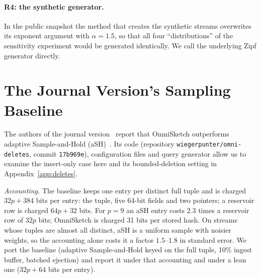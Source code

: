 \documentclass[sigconf,review,anonymous]{acmart}
\newcommand{\omni}{OmniSketch\xspace}
\begin{document}
\paragraph{R4: the synthetic generator.} In the public snapshot the method that creates the synthetic
streams overwrites its exponent argument with $\alpha=1.5$, so that all four ``distributions'' of the
sensitivity experiment would be generated identically. We call the underlying Zipf generator directly.

\section{The Journal Version's Sampling Baseline}\label{app:journal}

\begin{table}[t]
\centering\footnotesize\setlength{\tabcolsep}{2.5pt}
\caption{Journal-style stream (9 Zipf$^\dagger$ attributes with $\alpha=1.3$, 5 million records):
normalized absolute error for the journal version's query procedure and for our record-sampled queries
(mean of 3 seeds). ``Journal acct.'': memory accounting of that version's code.}
\label{tab:journal}

\end{table}

\begin{table}[t]
\centering\footnotesize\setlength{\tabcolsep}{3pt}
\caption{Journal-style queries at 10\,MB, by number of predicates $k$.}
\label{tab:journalk}

\end{table}

The authors of the journal version~\cite{omni-vldbj} report that \omni outperforms adaptive
Sample-and-Hold (aSH)~\cite{ash}. Its code (repository \texttt{wiegerpunter/omni-deletes}, commit
\texttt{17b969e}), configuration files and query generator allow us to examine the insert-only case here
and its bounded-deletion setting in Appendix~\ref{app:deletes}.

\emph{Accounting.} The baseline keeps one entry per distinct full tuple and is charged $32p+384$ bits per
entry: the tuple, five 64-bit fields and two pointers; a reservoir row is charged $64p+32$ bits. For $p=9$
an aSH entry costs $2.3$ times a reservoir row of $32p$ bits; \omni is charged 31 bits per stored hash. On
streams whose tuples are almost all distinct, aSH is a uniform sample with noisier weights, so the
accounting alone costs it a factor $1.5$--$1.8$ in standard error. We port the baseline (adaptive
Sample-and-Hold keyed on the full tuple, 10\% ingest buffer, batched ejection) and report it under that
accounting and under a lean one ($32p+64$ bits per entry).
\end{document}
